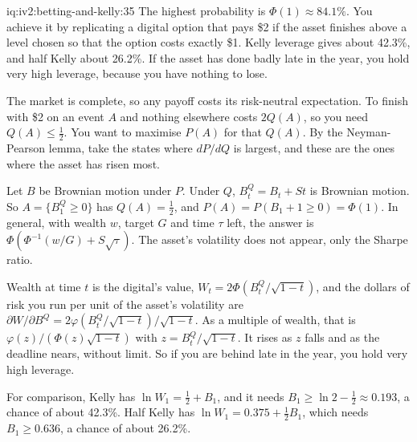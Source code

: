 \begin{solution}{iq:iv2:betting-and-kelly:35}
The highest probability is $\Phi(1) \approx 84.1\%$. You achieve it by replicating a digital option that pays \$2 if the asset finishes above a level chosen so that the option costs exactly \$1. Kelly leverage gives about 42.3\%, and half Kelly about 26.2\%. If the asset has done badly late in the year, you hold very high leverage, because you have nothing to lose.

The market is complete, so any payoff costs its risk-neutral expectation. To finish with \$2 on an event $A$ and nothing elsewhere costs $2Q(A)$, so you need $Q(A) \leq \tfrac12$. You want to maximise $P(A)$ for that $Q(A)$. By the Neyman-Pearson lemma, take the states where $dP/dQ$ is largest, and these are the ones where the asset has risen most.

Let $B$ be Brownian motion under $P$. Under $Q$, $B^Q_t = B_t + St$ is Brownian motion. So $A = \{B^Q_1 \geq 0\}$ has $Q(A) = \tfrac12$, and $P(A) = P(B_1 + 1 \geq 0) = \Phi(1)$. In general, with wealth $w$, target $G$ and time $\tau$ left, the answer is $\Phi\left(\Phi^{-1}(w/G) + S\sqrt\tau\right)$. The asset's volatility does not appear, only the Sharpe ratio.

Wealth at time $t$ is the digital's value, $W_t = 2\Phi\left(B^Q_t/\sqrt{1 - t}\right)$, and the dollars of risk you run per unit of the asset's volatility are $\partial W/\partial B^Q = 2\varphi\left(B^Q_t/\sqrt{1 - t}\right)/\sqrt{1 - t}$. As a multiple of wealth, that is $\varphi(z)/\left(\Phi(z)\sqrt{1 - t}\right)$ with $z = B^Q_t/\sqrt{1 - t}$. It rises as $z$ falls and as the deadline nears, without limit. So if you are behind late in the year, you hold very high leverage.

For comparison, Kelly has $\ln W_1 = \tfrac12 + B_1$, and it needs $B_1 \geq \ln 2 - \tfrac12 \approx 0.193$, a chance of about 42.3\%. Half Kelly has $\ln W_1 = 0.375 + \tfrac12 B_1$, which needs $B_1 \geq 0.636$, a chance of about 26.2\%.

\end{solution}
